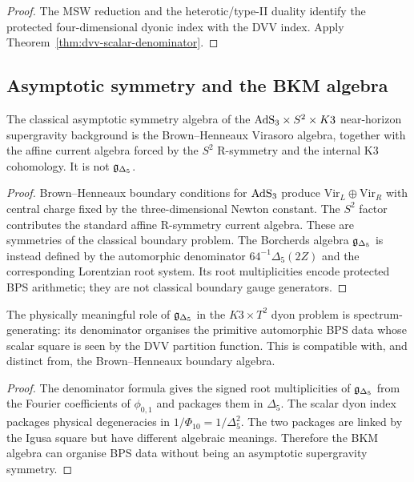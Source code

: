 \begin{proof}
The MSW reduction and the heterotic/type-II duality identify the
protected four-dimensional dyonic index with the DVV index. Apply
Theorem~\ref{thm:dvv-scalar-denominator}.
\end{proof}

\subsection*{Asymptotic symmetry and the BKM algebra}
\label{subsec:asymptotic-bkm}

\begin{theorem}
\label{thm:boundary-not-bkm}
The classical asymptotic symmetry algebra of the
$\mathrm{AdS}_3\times S^2\times K3$ near-horizon supergravity background is the
Brown--Henneaux Virasoro algebra, together with the affine current
algebra forced by the $S^2$ R-symmetry and the internal K3 cohomology.
It is not $\mathfrak{g}_{\Delta_5}$.
\end{theorem}

\begin{proof}
Brown--Henneaux boundary conditions for $\mathrm{AdS}_3$ produce
$\mathrm{Vir}_L\oplus\mathrm{Vir}_R$ with central charge fixed by the
three-dimensional Newton constant. The $S^2$ factor contributes the
standard affine R-symmetry current algebra. These are symmetries of the
classical boundary problem. The Borcherds algebra
$\mathfrak{g}_{\Delta_5}$ is instead defined by the automorphic denominator
$64^{-1}\Delta_5(2Z)$ and the corresponding Lorentzian root system. Its
root multiplicities encode protected BPS arithmetic; they are not
classical boundary gauge generators.
\end{proof}

\begin{proposition}
\label{prop:bkm-spectrum-generating-scoped}
The physically meaningful role of $\mathfrak{g}_{\Delta_5}$ in the
$K3\times T^2$ dyon problem is spectrum-generating: its denominator
organises the primitive automorphic BPS data whose scalar square is
seen by the DVV partition function. This is compatible with, and
distinct from, the Brown--Henneaux boundary algebra.
\end{proposition}

\begin{proof}
The denominator formula gives the signed root multiplicities of
$\mathfrak{g}_{\Delta_5}$ from the Fourier coefficients of $\phi_{0,1}$ and
packages them in $\Delta_5$. The scalar dyon index packages physical
degeneracies in $1/\Phi_{10}=1/\Delta_5^2$. The two packages are linked
by the Igusa square but have different algebraic meanings. Therefore
the BKM algebra can organise BPS data without being an asymptotic
supergravity symmetry.
\end{proof}

